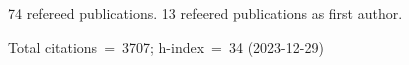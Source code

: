 74 refereed publications. 13 refeered publications as first author.

Total citations~=~3707; h-index~=~34 (2023-12-29)